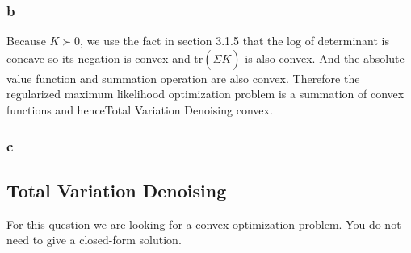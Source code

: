 \message{ !name(ass5_ChangLi.tex)}\documentclass[10pt,a4paper]{article}
\begin{document}
\subsubsection{b}
Because $K\succ 0$, we use the fact in section
3.1.5\cite{boyd2004convex} that the log of determinant is
concave so its negation is convex and
$\mathrm{tr}(\hat{\Sigma}K)$ is also convex. And the
absolute value function and summation operation are also
convex. Therefore the regularized maximum likelihood
optimization problem is a summation of convex functions and
henceTotal Variation Denoising convex.

\subsubsection{c}

\subsection{Total Variation Denoising}
For this question we are looking for a convex optimization problem. You do not need to give a closed-form solution.


	\renewcommand\refname{Bibliography}
	
	
\end{document}
